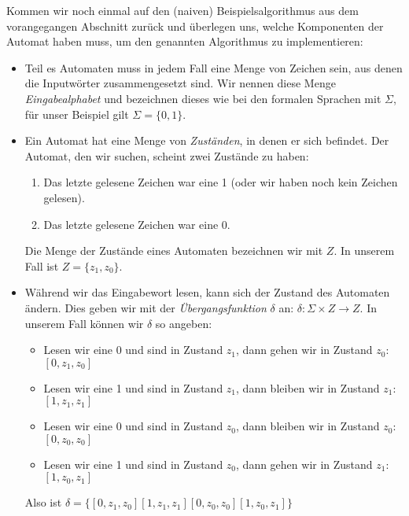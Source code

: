 Kommen wir noch einmal auf den (naiven) Beispielsalgorithmus
aus dem vorangegangen Abschnitt zurück
und überlegen uns, welche Komponenten der Automat haben muss,
um den genannten Algorithmus zu implementieren:
\begin{itemize}
    \item Teil es Automaten muss in jedem Fall eine Menge von Zeichen sein,
        aus denen die Inputwörter zusammengesetzt sind.
        Wir nennen diese Menge \emph{Eingabealphabet}
        und bezeichnen dieses wie bei den formalen Sprachen mit $\Sigma$,
        für unser Beispiel gilt $\Sigma = \{0,1\}$.

    \item Ein Automat hat eine Menge von \emph{Zuständen}, in denen er sich befindet.
        Der Automat, den wir suchen, scheint zwei Zustände zu haben:
        \begin{enumerate}
            \item Das letzte gelesene Zeichen war eine 1
                (oder wir haben noch kein Zeichen gelesen).
            \item Das letzte gelesene Zeichen war eine 0.
        \end{enumerate}
        Die Menge der Zustände eines Automaten bezeichnen wir mit $Z$.
        In unserem Fall ist $Z = \{z_1, z_0\}$.

    \item Während wir das Eingabewort lesen,
        kann sich der Zustand des Automaten ändern.
        Dies geben wir mit der \emph{Übergangsfunktion} $\delta$ an:
        $\delta: \Sigma \times Z \rightarrow Z$.
        In unserem Fall können wir $\delta$ so angeben:
        \begin{itemize}
            \item Lesen wir eine 0 und sind in Zustand $z_1$,
                dann gehen wir in Zustand $z_0$:\linebreak
                $[0,z_1,z_0]$
            \item Lesen wir eine 1 und sind in Zustand $z_1$,
                dann bleiben wir in Zustand $z_1$:\linebreak
                $[1,z_1,z_1]$
            \item Lesen wir eine 0 und sind in Zustand $z_0$,
                dann bleiben wir in Zustand $z_0$:\linebreak
                $[0,z_0,z_0]$
            \item Lesen wir eine 1 und sind in Zustand $z_0$,
                dann gehen wir in Zustand $z_1$:\linebreak
                $[1,z_0,z_1]$
        \end{itemize}
        Also ist $\delta = \{[0,z_1,z_0] [1,z_1,z_1] [0,z_0,z_0] [1,z_0,z_1]\}$


\end{itemize}
